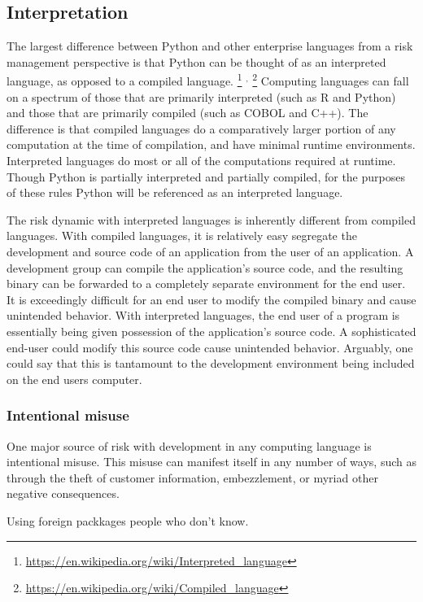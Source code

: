 	\subsection{Interpretation}
		The largest difference between Python and other enterprise languages from a risk management perspective is that Python can be thought of as an interpreted language, as opposed to a compiled language.
		\footnote{\url{https://en.wikipedia.org/wiki/Interpreted_language}}
		$^{,}$
		\footnote{\url{https://en.wikipedia.org/wiki/Compiled_language}}
		Computing languages can fall on a spectrum of those that are primarily interpreted (such as R and Python) and those that are primarily compiled (such as COBOL and C++). The difference is that compiled languages do a comparatively larger portion of any computation at the time of compilation, and have minimal runtime environments. Interpreted languages do most or all of the computations required at runtime. Though Python is partially interpreted and partially compiled, for the purposes of these rules Python will be referenced as an interpreted language.

		The risk dynamic with interpreted languages is inherently different from compiled languages. With compiled languages, it is relatively easy segregate the development and source code of an application from the user of an application. A development group can compile the application's source code, and the resulting binary can be forwarded to a completely separate environment for the end user. It is exceedingly difficult for an end user to modify the compiled binary and cause unintended behavior. With interpreted languages, the end user of a program is essentially being given possession of the application's source code. A sophisticated end-user could modify this source code cause unintended behavior. Arguably, one could say that this is tantamount to the development environment being included on the end users computer.

		\subsubsection{Intentional misuse}
			One major source of risk with development in any computing language is intentional misuse. This misuse can manifest itself in any number of ways, such as through the theft of customer information, embezzlement, or myriad other negative consequences.


		\iffalse
			Using foreign packkages people who don't know.

